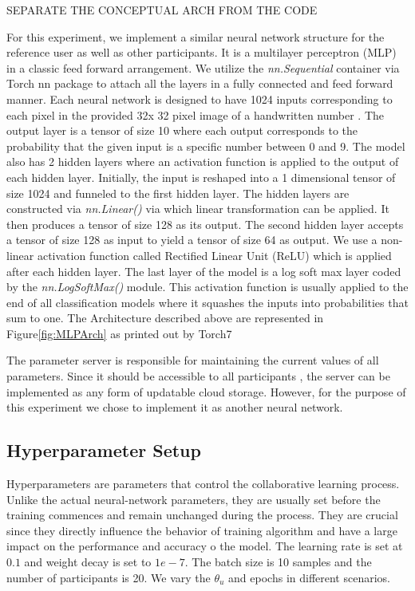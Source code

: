 \documentclass[conference]{IEEEtran}
\begin{document}
SEPARATE THE CONCEPTUAL ARCH FROM THE CODE

For this experiment, we implement a similar neural network structure for the reference user as well as other participants. It is a
multilayer perceptron (MLP) in a classic feed forward arrangement. We utilize the \textit{nn.Sequential} container via Torch nn package
to attach all the layers in a fully connected and feed forward manner. Each neural network is designed to have 1024 inputs
corresponding to each pixel in the provided 32x 32 pixel image of a handwritten number \cite{deng2012mnist}. The output layer is a
tensor of size 10 where each output corresponds to the probability that the given input is a specific number between 0 and 9. The model
also has 2 hidden layers where an activation function is applied to the output of each hidden layer.
Initially, the input is reshaped into a 1 dimensional tensor of size 1024 and funneled to the first hidden layer. The hidden layers are constructed via \textit{nn.Linear()} via which linear transformation can be applied. It then produces a tensor of size 128 as its output. The second hidden layer accepts a tensor of size 128 as input to yield a tensor of size 64 as output. We use a non-linear activation function called Rectified Linear Unit (ReLU) which is applied after each hidden layer. The last layer of the model is a log soft max layer coded by the \textit{nn.LogSoftMax()} module.  This activation function is usually applied to the end of all classification models where it squashes the inputs into probabilities that sum to one.
The Architecture described above are represented in Figure\ref{fig:MLPArch} as printed out by Torch7
   
The parameter server is responsible for maintaining the current values of all parameters. Since it should be accessible to all
participants , the server can be implemented as any form of updatable cloud storage. However, for the purpose of this experiment we
chose to implement it as another neural network. 

\subsection{Hyperparameter Setup}

Hyperparameters are parameters that control the collaborative learning process. Unlike the actual neural-network parameters, they are usually set before the training commences and remain unchanged during the process.
They are crucial since they directly influence the behavior of training algorithm and have a large impact on the performance and accuracy o the model.
The learning rate is set at $0.1$ and weight decay is set to $1e-7$. The batch size is 10 samples and the number of participants is 20. We vary the $\theta_u$ and epochs in different scenarios. 
\end{document}
